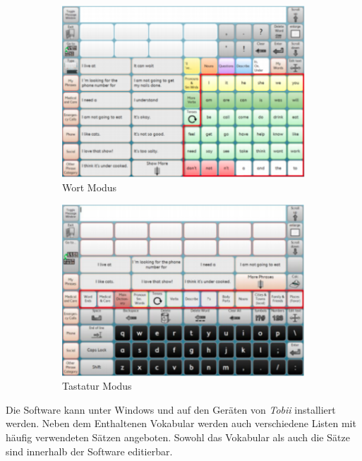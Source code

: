             \begin{figure}[H]
				\centering
				\begin{subfigure}{.5\textwidth}
  					\centering
  					\includegraphics[width=.8\linewidth]{images/sonoScribeWords.png}
  					\caption{Wort Modus \parencite[S. 13]{tobii:sonoScribeManual}}
                    \label{fig:sonoScribeWords}
                    
				\end{subfigure}%
				\begin{subfigure}{.5\textwidth}
  					\centering
  					\includegraphics[width=.8\linewidth]{images/SonoScribeKeboard.png}
  					\caption{Tastatur Modus \parencite[S. 22]{tobii:sonoScribeManual}}
                    \label{fig:sonoScribeKeyboard}
				\end{subfigure}
                \caption{ }
                \label{fig:sonoScribe}
			\end{figure}
        	
            Die Software kann unter Windows und auf den Geräten von \emph{Tobii} installiert werden. Neben dem Enthaltenen Vokabular werden auch verschiedene Listen mit häufig verwendeten Sätzen angeboten. Sowohl das Vokabular als auch die Sätze sind innerhalb der Software editierbar.
            
